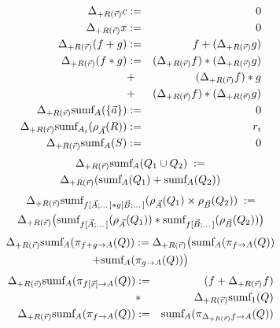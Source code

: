 \begin{figure}[t!]
\begin{eqnarray*}
\Delta_{+R(\vec{r})} c       &:=& 0 \\
\Delta_{+R(\vec{r})} x       &:=& 0 \\
\Delta_{+R(\vec{r})} (f + g) &:=&         f                + (\Delta_{+R(\vec{r})} g) \\
\Delta_{+R(\vec{r})} (f * g) &:=& (\Delta_{+R(\vec{r})} f) * (\Delta_{+R(\vec{r})} g) \\
                             &+ & (\Delta_{+R(\vec{r})} f) * g                        \\
                             &+ & (\Delta_{+R(\vec{r})} f) * (\Delta_{+R(\vec{r})} g)
\\
\Delta_{+R(\vec{r})} \mbox{sumf}_A(\{ \vec{a} \}) &:=& 0
\\
\Delta_{+R(\vec{r})} \mbox{sumf}_{A_i}(\rho_{\vec{A}}(R)) &:=& r_i
\\
\Delta_{+R(\vec{r})} \mbox{sumf}_A(S) &:=& 0
\end{eqnarray*}
\begin{multline*}
\Delta_{+R(\vec{r})}  \mbox{sumf}_A(Q_1 \cup Q_2) \; := \\
\Delta_{+R(\vec{r})} (\mbox{sumf}_A(Q_1) + \mbox{sumf}_A(Q_2))
\end{multline*}
\begin{multline*}
\Delta_{+R(\vec{r})} \mbox{sumf}_{f[\vec{A};\dots] * g[\vec{B};\dots]}(\rho_{\vec{A}}(Q_1) \times \rho_{\vec{B}}(Q_2)) \; := \\
\Delta_{+R(\vec{r})} \big( \mbox{sumf}_{f[\vec{A};\dots]}(\rho_{\vec{A}}(Q_1))
    * \mbox{sumf}_{f[\vec{B};\dots]}(\rho_{\vec{B}}(Q_2)) \big)
\end{multline*}
\begin{multline*}
\Delta_{+R(\vec{r})} \mbox{sumf}_A(\pi_{f + g \rightarrow A}(Q)) :=
\Delta_{+R(\vec{r})} \big( \mbox{sumf}_A(\pi_{f \rightarrow A}(Q)) \\
+ \mbox{sumf}_A(\pi_{g \rightarrow A}(Q)) \big)
\end{multline*}
\begin{eqnarray*}
\Delta_{+R(\vec{r})} \algsumf_A(\pi_{f[\vec{x}] \rightarrow A}(Q)) &:=&
   (f + \Delta_{+R(\vec{r})} f) \\
   &*& \Delta_{+R(\vec{r})} \algsumf_1(Q)
\\
\Delta_{+R(\vec{r})} \algsumf_A(\pi_{f \rightarrow A}(Q)) &:=&
   \algsumf_A(\pi_{\Delta_{+R(\vec{r})} f \rightarrow A}(Q)) \\

\end{eqnarray*}
\end{figure}
